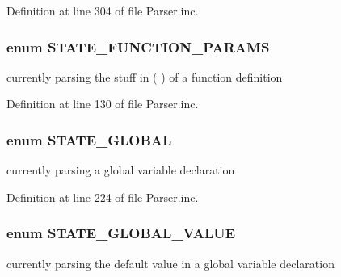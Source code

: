 \-Definition at line 304 of file \-Parser.\-inc.

\hypertarget{_parser_8inc_ae55f7caa8ab69a45dd52222f47d465f3}{
\subsubsection[{\-S\-T\-A\-T\-E\-\_\-\-F\-U\-N\-C\-T\-I\-O\-N\-\_\-\-P\-A\-R\-A\-M\-S}]{\setlength{\rightskip}{0pt plus 5cm}enum {\bf \-S\-T\-A\-T\-E\-\_\-\-F\-U\-N\-C\-T\-I\-O\-N\-\_\-\-P\-A\-R\-A\-M\-S}}}\label{_parser_8inc_ae55f7caa8ab69a45dd52222f47d465f3}
currently parsing the stuff in ( ) of a function definition 

\-Definition at line 130 of file \-Parser.\-inc.

\hypertarget{_parser_8inc_ad16e0901cdae850f55b8b6a14630362d}{
\subsubsection[{\-S\-T\-A\-T\-E\-\_\-\-G\-L\-O\-B\-A\-L}]{\setlength{\rightskip}{0pt plus 5cm}enum {\bf \-S\-T\-A\-T\-E\-\_\-\-G\-L\-O\-B\-A\-L}}}\label{_parser_8inc_ad16e0901cdae850f55b8b6a14630362d}
currently parsing a global variable declaration 

\-Definition at line 224 of file \-Parser.\-inc.

\hypertarget{_parser_8inc_a1fc963162fd4626f541e578b60f0c5a6}{
\subsubsection[{\-S\-T\-A\-T\-E\-\_\-\-G\-L\-O\-B\-A\-L\-\_\-\-V\-A\-L\-U\-E}]{\setlength{\rightskip}{0pt plus 5cm}enum {\bf \-S\-T\-A\-T\-E\-\_\-\-G\-L\-O\-B\-A\-L\-\_\-\-V\-A\-L\-U\-E}}}\label{_parser_8inc_a1fc963162fd4626f541e578b60f0c5a6}
currently parsing the default value in a global variable declaration 

